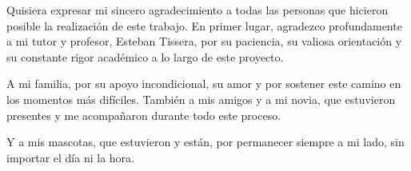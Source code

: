 Quisiera expresar mi sincero agradecimiento a todas las personas que hicieron posible la realización de este trabajo. En primer lugar, agradezco profundamente a mi tutor y profesor, Esteban Tissera, por su paciencia, su valiosa orientación y su constante rigor académico a lo largo de este proyecto.

A mi familia, por su apoyo incondicional, su amor y por sostener este camino en los momentos más difíciles. También a mis amigos y a mi novia, que estuvieron presentes y me acompañaron durante todo este proceso.

Y a mis mascotas, que estuvieron y están, por permanecer siempre a mi lado, sin importar el día ni la hora.
